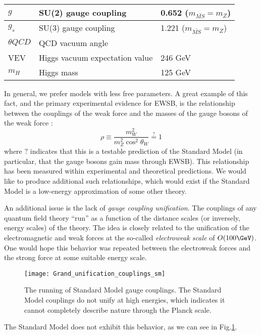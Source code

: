 \begin{table}
\begin{tabular}{| l | l | l |}
$g$               & SU(2) gauge coupling           & 0.652     ($m_{\bar{MS}} = m_Z$)                         \\ \hline
$g_s$             & SU(3) gauge coupling           & 1.221     ($m_{\bar{MS}} = m_Z$)                         \\ \hline
$\theta{QCD}$     & QCD vacuum angle               & \order 0                          \\ \hline
VEV               & Higgs vacuum expectation value & 246 GeV                           \\ \hline
$m_H$             & Higgs mass                     & 125 GeV                           \\ \hline
\end{tabular}
\end{table}
In general, we prefer models with less free parameters.
A great example of this fact, and the primary experimental evidence for EWSB, is the relationship between the couplings of the weak force and the masses of the gauge bosons of the weak force :
\begin{equation}
\rho \equiv \frac{m_W^2}{m_Z^2 \cos^2 \theta_W } \stackrel{?}{=} 1
\end{equation}
where $?$ indicates that this is a testable prediction of the Standard Model (in particular, that the gauge bosons gain mass through EWSB).
This relationship has been measured  within experimental and theoretical predictions.
We would like to produce additional such relationships, which would exist if the Standard Model is a low-energy approximation of some other theory.

An additional issue is the lack of \textit{gauge coupling unification}.
The couplings of any quantum field theory ``run'' as a function of the distance scales (or inversely, energy scales) of the theory.
The idea is closely related to the unification of the electromagnetic and weak forces at the so-called \textit{electroweak scale} of $O(100 \GeV)$.
One would hope this behavior was repeated between the electroweak forces and the strong force at some suitable energy scale.
\begin{figure}
\caption{The running of Standard Model gauge couplings.  The Standard Model couplings do not unify at high energies, which indicates it cannot completely describe nature through the Planck scale.} \label{fig:sm_gauge_coupling}
\texttt{[image: Grand\_unification\_couplings\_sm]}
\end{figure}
The Standard Model does not exhibit this behavior, as we can see in Fig.\ref{fig:sm_gauge_coupling}.

